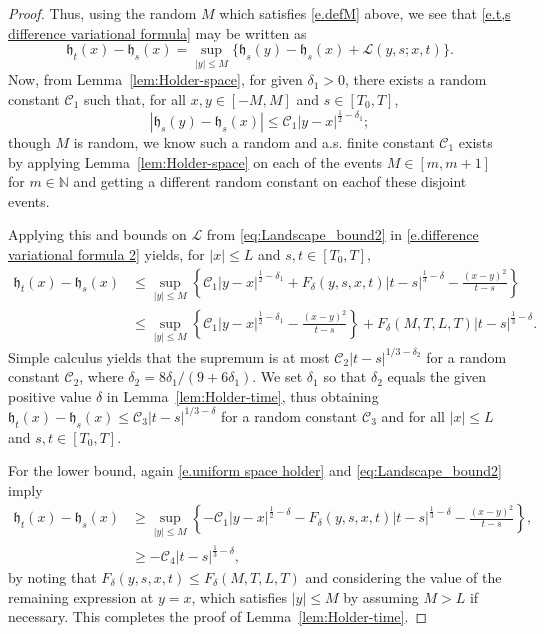 \documentclass[oneside,final,11pt]{amsart}
\theoremstyle{definition}
\newcounter{assum}
\newcommand{\fh}{\mathfrak{h}}
\newcommand{\nn}{\mathbb{N}}
\newcommand{\N}{\nn}
\newcommand{\CL}{\mathcal{L}}
\newcommand{\1}[1]{\mathbf{1}_{#1}}
\newcommand{\mc}{\mathcal}
\numberwithin{equation}{section}
\begin{document}
\begin{proof}
Thus, using the random $M$ which satisfies \eqref{e.defM} above, we see that \eqref{e.t,s difference variational formula} may be written as
%
\begin{equation}\label{e.difference variational formula 2}
\fh_t(x) - \fh_s(x) = \sup_{|y| \leq M} \bigl\{ \fh_s(y) - \fh_s(x) + \CL(y, s; x, t) \bigr\}.
\end{equation}
%
Now, from Lemma~\ref{lem:Holder-space}, for given $\delta_1>0$, there exists a random constant $\mc C_1$ such that, for all $x,y \in[-M,M]$ and $s\in[T_0,T]$,
%
\begin{equation}\label{e.uniform space holder}
|\fh_s(y) - \fh_s(x)| \leq \mc C_1|y-x|^{\frac{1}{2}-\delta_1};
\end{equation}
%
though $M$ is random, we know such a random and a.s. finite constant $\mc C_1$ exists by applying Lemma~\ref{lem:Holder-space} on each of the events $M\in[m,m+1]$ for $m\in\N$ and getting a different random constant on eachof these disjoint events.

Applying this and bounds on $\mc L$ from \eqref{eq:Landscape_bound2} in \eqref{e.difference variational formula 2} yields, for $|x|\leq L$ and $s,t \in[T_0,T]$,
%
\begin{align*}
\fh_t(x)-\fh_s(x) &\leq \sup_{|y|\leq M} \left\{\mc C_1|y-x|^{\frac{1}{2}-\delta_1} + F_{\delta}(y,s,x,t)|t-s|^{\frac{1}{3}-\delta} - \frac{(x-y)^2}{t-s}\right\} \\
%
&\leq \sup_{|y|\leq M} \left\{\mc C_1|y-x|^{\frac{1}{2}-\delta_1} - \frac{(x-y)^2}{t-s}\right\} + F_{\delta}(M,T,L,T)|t-s|^{\frac{1}{3}-\delta}.
\end{align*}
%
Simple calculus yields that the supremum is at most $\mc C_2 |t-s|^{1/3-\delta_2}$ for a random constant $\mc C_2$, where $\delta_2 = 8\delta_1/(9+6\delta_1)$. We set $\delta_1$ so that $\delta_2$ equals the given positive value $\delta$ in Lemma~\ref{lem:Holder-time}, thus obtaining  $\fh_t(x)-\fh_s(x) \leq \mc C_3 |t-s|^{1/3-\delta}$ for a random constant $\mc C_3$ and for all $|x|\leq L$ and $s,t\in[T_0,T]$.

For the lower bound, again \eqref{e.uniform space holder} and \eqref{eq:Landscape_bound2} imply
%
\begin{align*}
\fh_t(x)-\fh_s(x) &\geq \sup_{|y|\leq M} \left\{-\mc C_1|y-x|^{\frac{1}{2}-\delta} - F_{\delta}(y,s,x,t)|t-s|^{\frac{1}{3}-\delta} - \frac{(x-y)^2}{t-s}\right\},\\
%
&\geq -\mc C_4 |t-s|^{\frac{1}{3}-\delta},
\end{align*}
%
by noting that $F_{\delta}(y,s,x,t) \leq F_\delta(M,T,L,T)$ and considering the value of the remaining expression at $y = x$, which satisfies $|y| \leq M$ by assuming $M>L$ if necessary. This completes the proof of Lemma~\ref{lem:Holder-time}.
\end{proof}
\end{document}
